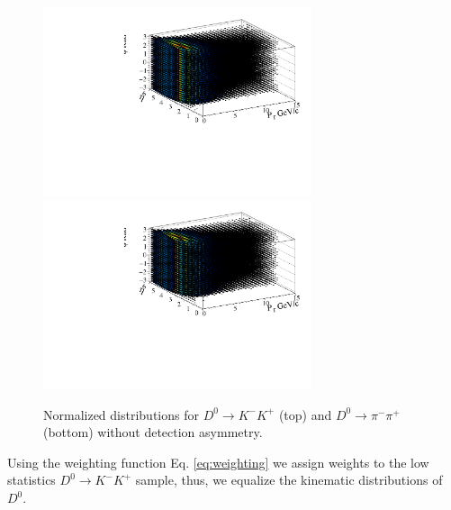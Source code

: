 \documentclass{article}
\begin{document}
    \begin{figure}[h!]
        \centering
        \includegraphics[width = 0.7\textwidth]{../../work/RapidSimAnalysis/NewWeightingFunction/Plots/KmKpNormalizedDistribution.pdf}
        \includegraphics[width = 0.7\textwidth]{../../work/RapidSimAnalysis/NewWeightingFunction/Plots/pimpipNormalizedDistribution.pdf}
        \caption{Normalized distributions for $D^0\to K^-K^+$ (top) and $D^0\to \pi^-\pi^+$ (bottom) without detection asymmetry.}
    \end{figure}

    Using the weighting function Eq. \ref{eq:weighting} we assign weights to the low statistics $D^0 \to K^-K^+$ sample, thus, we equalize the kinematic distributions of $D^0$.
\end{document}
